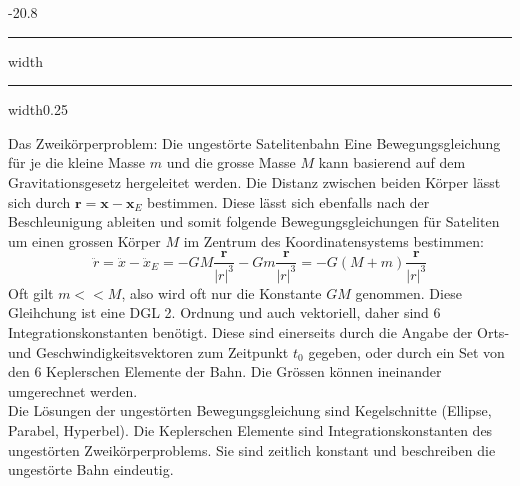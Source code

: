 \documentclass[8pt, landscape, fleqn]{scrartcl}
\makeatletter
\renewcommand{\subsection}{\@startsection{subsection}{1}{0mm}%
{-2\baselineskip}{0.8\baselineskip}%
{\hrule depth 0.2pt width\columnwidth\hrule depth0.75pt
width0.25\columnwidth\vspace*{1.2em}\large\bfseries\rmfamily}}
\makeatother
\begin{document}
\begin{multicols*}{3}
\subsection{Das Zweikörperproblem: Die ungestörte Satelitenbahn}
Eine Bewegungsgleichung für je die kleine Masse $m$ und die grosse Masse $M$ kann basierend auf dem Gravitationsgesetz hergeleitet werden. Die Distanz zwischen beiden Körper lässt sich durch $\mathbf{r} = \mathbf{x}-\mathbf{x}_E$ bestimmen. Diese lässt sich ebenfalls nach der Beschleunigung ableiten und somit folgende Bewegungsgleichungen für Sateliten um einen grossen Körper $M$ im Zentrum des Koordinatensystems bestimmen:
\begin{equation*}
    \ddot{r} = \ddot{x}-\ddot{x}_E = -GM \frac{\mathbf{r}}{|r|^3} -  Gm \frac{\mathbf{r}}{|r|^3} = -G(M+m)\frac{\mathbf{r}}{|r|^3}
\end{equation*}
Oft gilt $m<< M$, also wird oft nur die Konstante $GM$ genommen. Diese Gleihchung ist eine DGL 2. Ordnung und auch vektoriell, daher sind 6 Integrationskonstanten benötigt. Diese sind einerseits durch die Angabe der Orts- und Geschwindigkeitsvektoren zum Zeitpunkt $t_0$ gegeben, oder durch ein Set von den 6 Keplerschen Elemente der Bahn. Die Grössen können ineinander umgerechnet werden. \\

Die Lösungen der ungestörten Bewegungsgleichung sind Kegelschnitte (Ellipse, Parabel, Hyperbel). Die Keplerschen Elemente sind Integrationskonstanten des ungestörten Zweikörperproblems. Sie sind zeitlich konstant und beschreiben die ungestörte Bahn eindeutig.

\end{multicols*}
\end{document}
